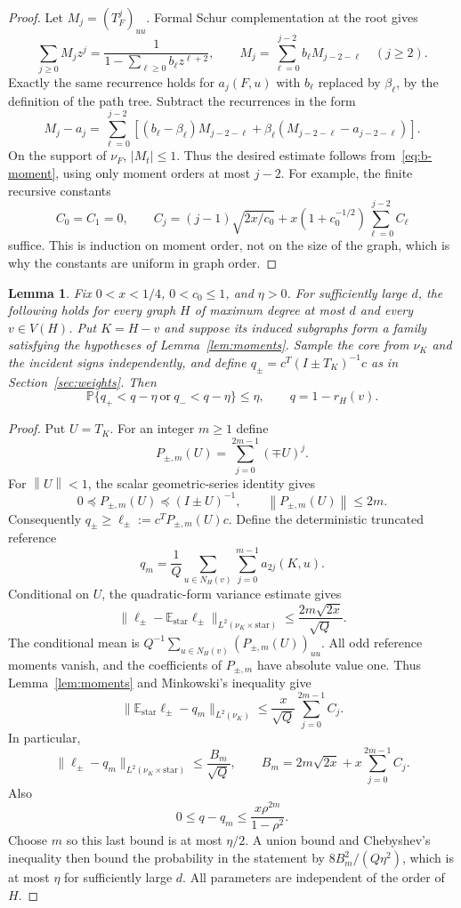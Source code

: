 \documentclass[11pt]{article}
\numberwithin{equation}{section}
\newtheorem{lemma}[theorem]{Lemma}
\theoremstyle{remark}
\newcommand{\norm}[1]{\left\lVert#1\right\rVert}
\newcommand{\E}{\mathbb E}
\newcommand{\Prob}{\mathbb P}
\begin{document}
\begin{proof}
Let $M_j=(T_F^j)_{uu}$. Formal Schur complementation at the root gives
\[
 \sum_{j\ge0}M_jz^j
 =\frac1{1-\sum_{\ell\ge0}b_\ell z^{\ell+2}},
 \qquad
 M_j=\sum_{\ell=0}^{j-2}b_\ell M_{j-2-\ell}\quad(j\ge2).
\]
Exactly the same recurrence holds for $a_j(F,u)$ with $b_\ell$
replaced by $\beta_\ell$, by the definition of the path tree.
Subtract the recurrences in the form
\[
 M_j-a_j
 =\sum_{\ell=0}^{j-2}
 \left[(b_\ell-\beta_\ell)M_{j-2-\ell}
       +\beta_\ell(M_{j-2-\ell}-a_{j-2-\ell})\right].
\]
On the support of $\nu_F$, $|M_t|\le1$. Thus the desired estimate
follows from~\eqref{eq:b-moment}, using only moment orders at most
$j-2$. For example, the finite recursive constants
\[
 C_0=C_1=0,\qquad
 C_j=(j-1)\sqrt{2x/c_0}
      +x(1+c_0^{-1/2})\sum_{\ell=0}^{j-2}C_\ell
\]
suffice. This is induction on moment order, not on the size of the
graph, which is why the constants are uniform in graph order.
\end{proof}

\begin{lemma}\label{lem:lower-q}
Fix $0<x<1/4$, $0<c_0\le1$, and $\eta>0$. For sufficiently large $d$,
the following holds for every graph $H$ of maximum degree at most
$d$ and every $v\in V(H)$. Put $K=H-v$ and suppose its induced
subgraphs form a family satisfying the hypotheses of
Lemma~\ref{lem:moments}. Sample the core from $\nu_K$ and the
incident signs independently, and define
$q_\pm=c^T(I\pm T_K)^{-1}c$ as in Section~\ref{sec:weights}.
Then
\[
 \Prob\{q_+<q-\eta\ \text{or}\ q_-<q-\eta\}\le\eta,
 \qquad q=1-r_H(v).
\]
\end{lemma}
\begin{proof}
Put $U=T_K$. For an integer $m\ge1$ define
\[
 P_{\pm,m}(U)=\sum_{j=0}^{2m-1}(\mp U)^j.
\]
For $\norm U<1$, the scalar geometric-series identity gives
\[
 0\preceq P_{\pm,m}(U)\preceq(I\pm U)^{-1},
 \qquad \norm{P_{\pm,m}(U)}\le2m.
\]
Consequently $q_\pm\ge\ell_\pm:=c^TP_{\pm,m}(U)c$.
Define the deterministic truncated reference
\[
 q_m=\frac1Q\sum_{u\in N_H(v)}
            \sum_{j=0}^{m-1}a_{2j}(K,u).
\]
Conditional on $U$, the quadratic-form variance estimate gives
\[
 \|\ell_\pm-\E_{\mathrm{star}}\ell_\pm
       \|_{L^2(\nu_K\times\mathrm{star})}
 \le \frac{2m\sqrt{2x}}{\sqrt Q}.
\]
The conditional mean is
$Q^{-1}\sum_{u\in N_H(v)}(P_{\pm,m}(U))_{uu}$.
All odd reference moments vanish, and the coefficients of
$P_{\pm,m}$ have absolute value one. Thus
Lemma~\ref{lem:moments} and Minkowski's inequality give
\[
 \|\E_{\mathrm{star}}\ell_\pm-q_m\|_{L^2(\nu_K)}
 \le\frac{x}{\sqrt Q}\sum_{j=0}^{2m-1}C_j.
\]
In particular,
\[
 \|\ell_\pm-q_m\|_{L^2(\nu_K\times\mathrm{star})}
 \le\frac{B_m}{\sqrt Q},
 \qquad
 B_m=2m\sqrt{2x}+x\sum_{j=0}^{2m-1}C_j.
\]
Also
\[
 0\le q-q_m\le\frac{x\rho^{2m}}{1-\rho^2}.
\]
Choose $m$ so this last bound is at most $\eta/2$. A union bound and
Chebyshev's inequality then bound the probability in the statement
by $8B_m^2/(Q\eta^2)$, which is at most $\eta$ for sufficiently large
$d$. All parameters are independent of the order of $H$.
\end{proof}
\end{document}
